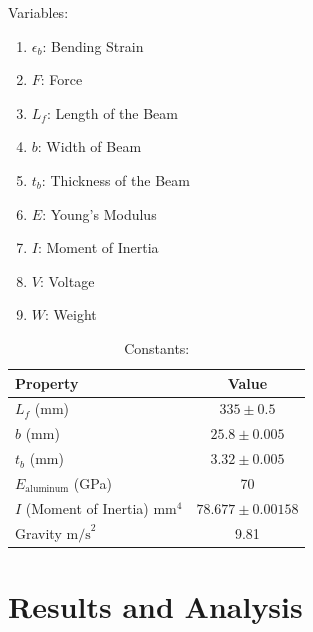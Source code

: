 \documentclass{article}
\begin{document}
Variables:
\begin{enumerate}[label = \Roman*.]
    \item \(\epsilon_b\): Bending Strain
    \item \(F\): Force
    \item \(L_f\): Length of the Beam
    \item \(b\): Width of Beam
    \item \(t_b\): Thickness of the Beam
    \item \(E\): Young's Modulus
    \item \(I\): Moment of Inertia
    \item \( V \): Voltage
    \item \( W \): Weight
\end{enumerate}

\begin{table}[ht]
    \centering
    \caption{Constants:}
    \begin{tabular}{|l|c|}
    \hline
    \textbf{Property} & \textbf{Value} \\ \hline
    \(L_{f}\) (mm) & \( 335 \pm 0.5 \) \\ \hline
    \(b\) (mm) & \( 25.8 \pm 0.005 \) \\ \hline
    \(t_b\) (mm) & \( 3.32 \pm 0.005 \) \\ \hline
    \(E_{\text{aluminum}}\) (GPa) & 70 \\ \hline
    $I$ (Moment of Inertia) \( \text{mm}^4 \) & \( 78.677 \pm 0.00158 \) \\ \hline
    Gravity \( \text{m/s}^2 \) & 9.81 \\ \hline
    \end{tabular}
    \label{tab:constants}
\end{table}
    

\section{Results and Analysis}
\end{document}
